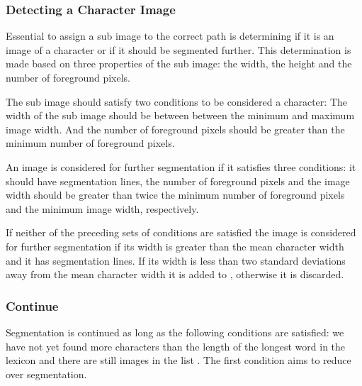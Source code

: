 \subsubsection{Detecting a Character Image}
\label{sss:method:segmentaton:segmentfurther}
Essential to assign a sub image to the correct path is determining if it is an image of a character or if it should be segmented further. This determination is made based on three properties of the sub image: the width, the height and the number of foreground pixels. 

The sub image should satisfy two conditions to be considered a character: The width of the sub image should be between between the minimum and maximum image width. And the number of foreground pixels should be greater than the minimum number of foreground pixels.

An image is considered for further segmentation if it satisfies three conditions: it should have segmentation lines, the number of foreground pixels and the image width should be greater than twice the minimum number of foreground pixels and the minimum image width, respectively. 

If neither of the preceding sets of conditions are satisfied the image is considered for further segmentation if its width is greater than the mean character width and it has segmentation lines. If its width is less than two standard deviations away from the mean character width it is added to \characters, otherwise it is discarded.

\subsubsection{Continue}
\label{sss:method:segmentaton:termination}
Segmentation is continued as long as the following conditions are satisfied: we have not yet found more characters than the length of the longest word in the lexicon and there are still images in the list \segmentfurther. The first condition aims to reduce over segmentation.